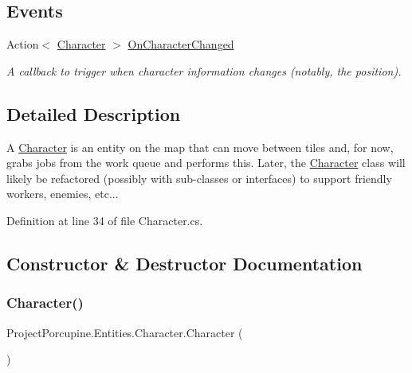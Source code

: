 \subsection*{Events}
\begin{DoxyCompactItemize}
\item 
Action$<$ \hyperlink{class_project_porcupine_1_1_entities_1_1_character}{Character} $>$ \hyperlink{class_project_porcupine_1_1_entities_1_1_character_a6371cd47c886db713e136ddefeb6c108}{On\+Character\+Changed}
\begin{DoxyCompactList}\small\item\em A callback to trigger when character information changes (notably, the position). \end{DoxyCompactList}\end{DoxyCompactItemize}


\subsection{Detailed Description}
A \hyperlink{class_project_porcupine_1_1_entities_1_1_character}{Character} is an entity on the map that can move between tiles and, for now, grabs jobs from the work queue and performs this. Later, the \hyperlink{class_project_porcupine_1_1_entities_1_1_character}{Character} class will likely be refactored (possibly with sub-\/classes or interfaces) to support friendly workers, enemies, etc... 



Definition at line 34 of file Character.\+cs.



\subsection{Constructor \& Destructor Documentation}
\mbox{\label{class_project_porcupine_1_1_entities_1_1_character_a8db8c2f16e32a09749adf9e14eb6f952}} 
\subsubsection{\texorpdfstring{Character()}{Character()}\hspace{0.1cm}{\footnotesize\ttfamily [1/2]}}
{\footnotesize\ttfamily Project\+Porcupine.\+Entities.\+Character.\+Character (\begin{DoxyParamCaption}{ }\end{DoxyParamCaption})}



